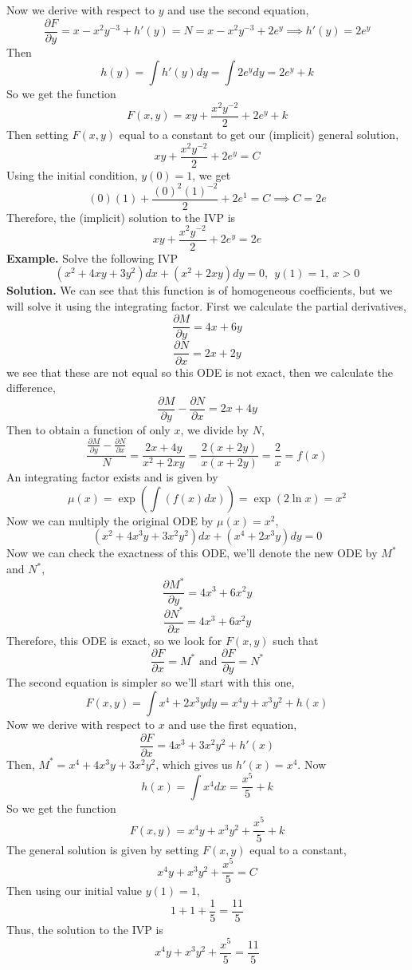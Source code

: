 \documentclass[openany]{report}
\begin{document}
Now we derive with respect to $y$ and use the second equation, 
\[\frac{\partial F}{\partial y} = x - x^2y^{-3} + h'(y) = N = x - x^2y^{-3} + 2e^y \implies h'(y) = 2e^y\]
Then 
\[h(y) = \int h'(y)dy = \int 2e^ydy = 2e^{y} + k\]
So we get the function 
\[F(x,y) = xy + \frac{x^2y^{-2}}{2} + 2e^y + k\]
Then setting $F(x,y)$ equal to a constant to get our (implicit) general solution, 
\[xy+ \frac{x^2y^{-2}}{2} + 2e^y = C\]
Using the initial condition, $y(0) = 1$, we get
\[(0)(1) + \frac{(0)^2(1)^{-2}}{2} + 2e^{1} = C \implies C = 2e\]
Therefore, the (implicit) solution to the IVP is
\[xy+ \frac{x^2y^{-2}}{2} + 2e^y = 2e\]
\textbf{Example.} Solve the following IVP
\[(x^2+4xy + 3y^2)dx + (x^2 + 2xy)dy = 0, \ \ y(1) = 1, \ x > 0\]
\textbf{Solution.} We can see that this function is of homogeneous coefficients, but we will solve it using the integrating factor. First we calculate the partial derivatives,
\[\frac{\partial M}{\partial y} = 4x + 6y\]
\[\frac{\partial N}{\partial x} = 2x + 2y\]
we see that these are not equal so this ODE is not exact, then we calculate the difference,
\[\frac{\partial M}{\partial y} - \frac{\partial N}{\partial x} = 2x + 4y\]
Then to obtain a function of only $x$, we divide by $N$, 
\[\frac{\frac{\partial M}{\partial y} - \frac{\partial N}{\partial x}}{N} = \frac{2x + 4y}{x^2 + 2xy} = \frac{2(x+2y)}{x(x + 2y)} = \frac{2}{x} = f(x)\]
An integrating factor exists and is given by
\[\mu(x) = \exp\left(\int(f(x)dx)\right) = \exp\left(2\ln x\right) = x^2\]
Now we can multiply the original ODE by $\mu(x) = x^2$,
\[(x^2 + 4x^3y + 3x^2y^2)dx + (x^4 + 2x^3y)dy = 0\]
Now we can check the exactness of this ODE, we'll denote the new ODE by $M^*$ and $N^*$,
\[\frac{\partial M^*}{\partial y} = 4x^3 + 6x^2y\]
\[\frac{\partial N^*}{\partial x} = 4x^3 + 6x^2y\]
Therefore, this ODE is exact, so we look for $F(x,y)$ such that
\[\frac{\partial F}{\partial x} = M^* \text{ and } \frac{\partial F}{\partial y} = N^*\]
The second equation is simpler so we'll start with this one, 
\[F(x,y) = \int x^4 + 2x^3ydy = x^4y + x^3y^2 + h(x)\]
Now we derive with respect to $x$ and use the first equation,
\[\frac{\partial F}{\partial x} = 4x^3 + 3x^2y^2 + h'(x)\]
Then, $M^* = x^4 + 4x^3y + 3x^2y^2$, which gives us $h'(x) = x^4$. Now 
\[h(x) = \int x^4dx = \frac{x^5}{5} + k\]
So we get the function
\[F(x,y) = x^4y + x^3y^2 + \frac{x^5}{5} + k\]
The general solution is given by setting $F(x,y)$ equal to a constant,
\[x^4y + x^3y^2 + \frac{x^5}{5} = C\]
Then using our initial value $y(1) = 1$,
\[1 + 1  + \frac{1}{5} = \frac{11}{5}\]
Thus, the solution to the IVP is 
\[x^4y + x^3y^2 + \frac{x^5}{5} = \frac{11}{5}\]
\end{document}
